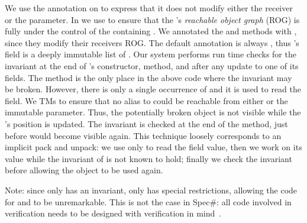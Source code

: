 We use the \Q@read@ annotation on \Q@equals@ to express that it does not modify either the
receiver or the parameter. In \Q@Cage@ we use 
 to ensure
that the \Q@Hamster@'s \emph{reachable object graph} (ROG) is fully under the control
of the containing \Q@Cage@. 
We annotated the \Q@move@
and \Q@moveTo@ methods with \Q@mut@, since they modify
their receivers ROG. The default annotation is always \Q@imm@, thus \Q@Cage@'s \Q@path@ field is a deeply immutable list of \Q@Point@s.
Our system performs run time checks for the invariant
at the end of \Q@Cage@'s constructor, \Q@moveTo@ method, and after any update to one of its fields.
The \Q@moveTo@ method is the only place in the above code where the invariant may be broken. However, there is only a single occurrence of \Q@this@ and it is used to read the \Q@h@ field. We  TMs to ensure that no alias to \Q@this@ could be reachable from either \Q@h@ or the immutable \Q@Point@ parameter. Thus, the potentially broken \Q@this@ object is not visible while the \Q@Hamster@'s position is updated. 
The invariant is checked at the end of the \Q@moveTo@ method, just before \Q@this@ would become visible again.
This technique loosely corresponds to an implicit pack and unpack: we use \Q@this@ only to read the field value, then we work on its value while the invariant of \Q@this@ is not known to hold; finally we check the invariant before allowing the object to  be used again.

Note: since only \Q@Cage@ has an invariant,
 only \Q@Cage@ has special restrictions, allowing the code for \Q@Point@ and \Q@Hamster@ to be unremarkable.
 This is not the case in Spec\#: all code involved in  verification needs to be designed with verification in mind~\cite{barnett2011specification}.

